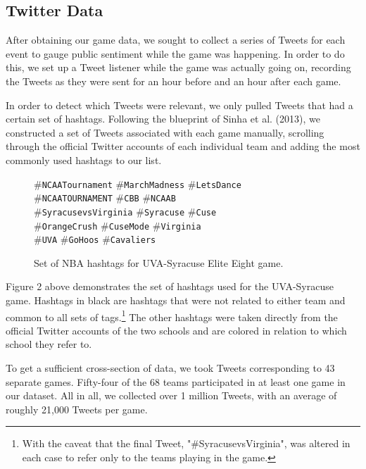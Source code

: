 \documentclass[12pt]{article}
\begin{document}
\begin{doublespacing}
\subsection{Twitter Data}

After obtaining our game data, we sought to collect a series of Tweets for each event to gauge public sentiment while the game was happening. In order to do this, we set up a Tweet listener while the game was actually going on, recording the Tweets as they were sent for an hour before and an hour after each game. 

In order to detect which Tweets were relevant, we only pulled Tweets that had a certain set of hashtags. Following the blueprint of Sinha et al. (2013), we constructed a set of Tweets associated with each game manually, scrolling through the official Twitter accounts of each individual team and adding the most commonly used hashtags to our list. 
\vspace{1cm}
\begin{figure} [H]
    \begin{center}
    \#\texttt{NCAATournament} \#\texttt{MarchMadness} \#\texttt{LetsDance} \\ 
    \#\texttt{NCAATOURNAMENT} \#\texttt{CBB} \#\texttt{NCAAB} \\ 
    \#\texttt{SyracusevsVirginia} \textcolor{cuse}{\#\texttt{Syracuse}} \textcolor{cuse}{\#\texttt{Cuse}} \\ 
    \textcolor{cuse}{\#\texttt{OrangeCrush}} \textcolor{cuse}{\#\texttt{CuseMode}} \textcolor{uva}{\#\texttt{Virginia}} \\ 
    \textcolor{uva}{\#\texttt{UVA}} \textcolor{uva}{\#\texttt{GoHoos}} \textcolor{uva}{\#\texttt{Cavaliers}} \\
    \caption{Set of NBA hashtags for UVA-Syracuse Elite Eight game.}
    \end{center}
\end{figure}

Figure 2 above demonstrates the set of hashtags used for the UVA-Syracuse game. Hashtags in black are hashtags that were not related to either team and common to all sets of tags.\footnote{With the caveat that the final Tweet, "\#SyracusevsVirginia", was altered in each case to refer only to the teams playing in the game.} The other hashtags were taken directly from the official Twitter accounts of the two schools and are colored in relation to which school they refer to. 

To get a sufficient cross-section of data, we took Tweets corresponding to 43 separate games. Fifty-four of the 68 teams participated in at least one game in our dataset. All in all, we collected over 1 million Tweets, with an average of roughly 21,000 Tweets per game. 


\end{doublespacing}
\end{document}
